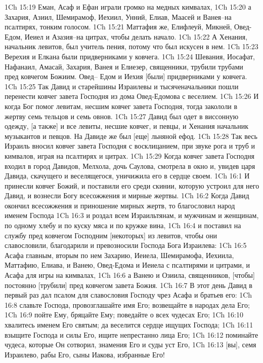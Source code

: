 1Ch 15:19  Еман, Асаф и Ефан играли громко на медных кимвалах,
1Ch 15:20  а Захария, Азиил, Шемирамоф, Иехиил, Унний, Елиав, Маасей и Ванея--на псалтирях, тонким голосом.
1Ch 15:21  Маттафия же, Елифлеуй, Микней, Овед-Едом, Иеиел и Азазия--на цитрах, чтобы делать начало.
1Ch 15:22  А Хенания, начальник левитов, был учитель пения, потому что был искусен в нем.
1Ch 15:23  Верехия и Елкана были придверниками у ковчега.
1Ch 15:24  Шевания, Иосафат, Нафанаил, Амасай, Захария, Ванея и Елиезер, священники, трубили трубами пред ковчегом Божиим. Овед-- Едом и Иехия [были] придверниками у ковчега.
1Ch 15:25  Так Давид и старейшины Израилевы и тысяченачальники пошли перенести ковчег завета Господня из дома Овед-Едомова с веселием.
1Ch 15:26  И когда Бог помог левитам, несшим ковчег завета Господня, тогда закололи в жертву семь тельцов и семь овнов.
1Ch 15:27  Давид был одет в виссонную одежду, [а также] и все левиты, несшие ковчег, и певцы, и Хенания начальник музыкантов и певцов. На Давиде же был [еще] льняной ефод.
1Ch 15:28  Так весь Израиль вносил ковчег завета Господня с восклицанием, при звуке рога и труб и кимвалов, играя на псалтирях и цитрах.
1Ch 15:29  Когда ковчег завета Господня входил в город Давидов, Мелхола, дочь Саулова, смотрела в окно и, увидев царя Давида, скачущего и веселящегося, уничижила его в сердце своем.
1Ch 16:1  И принесли ковчег Божий, и поставили его среди скинии, которую устроил для него Давид, и вознесли Богу всесожжения и мирные жертвы.
1Ch 16:2  Когда Давид окончил всесожжения и приношение мирных жертв, то благословил народ именем Господа
1Ch 16:3  и роздал всем Израильтянам, и мужчинам и женщинам, по одному хлебу и по куску мяса и по кружке вина,
1Ch 16:4  и поставил на службу пред ковчегом Господним [некоторых] из левитов, чтобы они славословили, благодарили и превозносили Господа Бога Израилева:
1Ch 16:5  Асафа главным, вторым по нем Захарию, Иеиела, Шемирамофа, Иехиила, Маттафию, Елиава, и Ванею, Овед-Едома и Иеиела с псалтирями и цитрами, и Асафа для игры на кимвалах,
1Ch 16:6  а Ванею и Озиила, священников, [чтобы] постоянно [трубили] пред ковчегом завета Божия.
1Ch 16:7  В этот день Давид в первый раз дал псалом для славословия Господу чрез Асафа и братьев его:
1Ch 16:8  славьте Господа, провозглашайте имя Его; возвещайте в народах дела Его;
1Ch 16:9  пойте Ему, бряцайте Ему; поведайте о всех чудесах Его;
1Ch 16:10  хвалитесь именем Его святым; да веселится сердце ищущих Господа;
1Ch 16:11  взыщите Господа и силы Его, ищите непрестанно лица Его;
1Ch 16:12  поминайте чудеса, которые Он сотворил, знамения Его и суды уст Его,
1Ch 16:13  [вы], семя Израилево, рабы Его, сыны Иакова, избранные Его!
